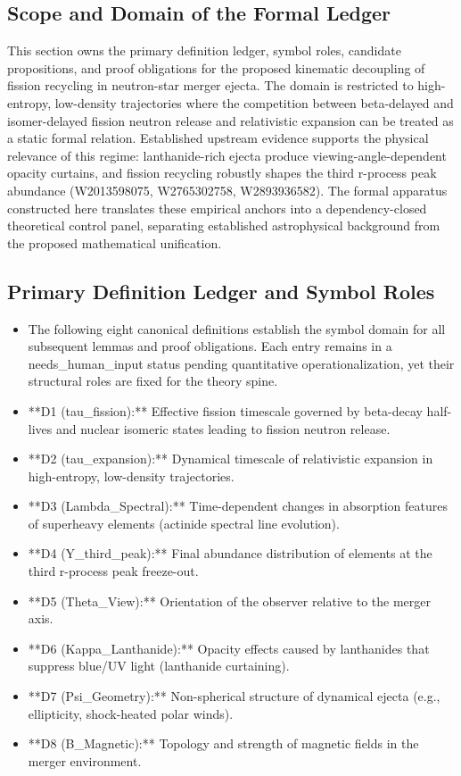 \documentclass[conference]{IEEEtran}
\begin{document}
\subsection{Scope and Domain of the Formal Ledger}
This section owns the primary definition ledger, symbol roles, candidate propositions, and proof obligations for the proposed kinematic decoupling of fission recycling in neutron-star merger ejecta. The domain is restricted to high-entropy, low-density trajectories where the competition between beta-delayed and isomer-delayed fission neutron release and relativistic expansion can be treated as a static formal relation. Established upstream evidence supports the physical relevance of this regime: lanthanide-rich ejecta produce viewing-angle-dependent opacity curtains, and fission recycling robustly shapes the third r-process peak abundance (W2013598075, W2765302758, W2893936582). The formal apparatus constructed here translates these empirical anchors into a dependency-closed theoretical control panel, separating established astrophysical background from the proposed mathematical unification.~\cite{cite_2bf3a687e25803e4,cite_492ec5910d5efd57,cite_f16e65d18232c78c}

\subsection{Primary Definition Ledger and Symbol Roles}
\begin{itemize}
\item The following eight canonical definitions establish the symbol domain for all subsequent lemmas and proof obligations. Each entry remains in a needs\_human\_input status pending quantitative operationalization, yet their structural roles are fixed for the theory spine.
\item **D1 (tau\_fission):** Effective fission timescale governed by beta-decay half-lives and nuclear isomeric states leading to fission neutron release.
\item **D2 (tau\_expansion):** Dynamical timescale of relativistic expansion in high-entropy, low-density trajectories.
\item **D3 (Lambda\_Spectral):** Time-dependent changes in absorption features of superheavy elements (actinide spectral line evolution).
\item **D4 (Y\_third\_peak):** Final abundance distribution of elements at the third r-process peak freeze-out.
\item **D5 (Theta\_View):** Orientation of the observer relative to the merger axis.
\item **D6 (Kappa\_Lanthanide):** Opacity effects caused by lanthanides that suppress blue/UV light (lanthanide curtaining).
\item **D7 (Psi\_Geometry):** Non-spherical structure of dynamical ejecta (e.g., ellipticity, shock-heated polar winds).
\item **D8 (B\_Magnetic):** Topology and strength of magnetic fields in the merger environment.
\end{itemize}
\end{document}
